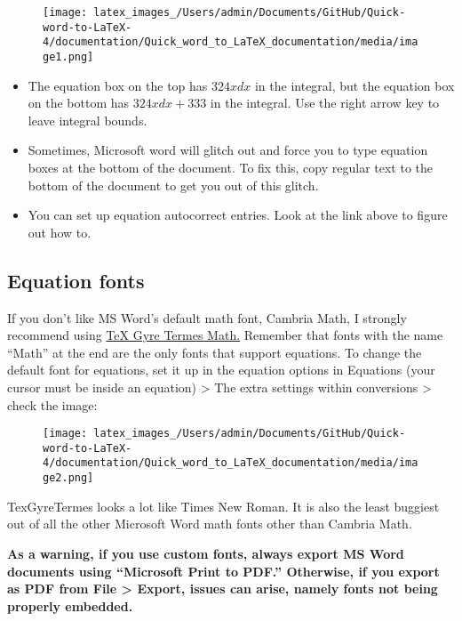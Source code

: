 \documentclass[12pt]{article}
\theoremstyle{plain}
\theoremstyle{remark}
\theoremstyle{definition}
\begin{document}
\begin{figure}[H]
\centering
\texttt{[image: latex\_images\_/Users/admin/Documents/GitHub/Quick-word-to-LaTeX-4/documentation/Quick\_word\_to\_LaTeX\_documentation/media/image1.png]}
\end{figure}


\begin{itemize}
\item
  The equation box on the top has \(324xdx\) in the integral, but the
  equation box on the bottom has \(324xdx + 333\) in the integral. Use
  the right arrow key to leave integral bounds.
\item
  Sometimes, Microsoft word will glitch out and force you to type
  equation boxes at the bottom of the document. To fix this, copy
  regular text to the bottom of the document to get you out of this
  glitch.
\item
  You can set up equation autocorrect entries. Look at the link above to
  figure out how to.
\end{itemize}


\subsection{Equation fonts}

If you don't like MS Word's default math font, Cambria Math, I strongly
recommend using
\href{https://ctan.org/pkg/tex-gyre-math-termes?lang=en}{TeX Gyre Termes
Math.} Remember that fonts with the name ``Math'' at the end are the
only fonts that support equations. To change the default font for
equations, set it up in the equation options in Equations (your cursor
must be inside an equation) \textgreater{} The extra settings within
conversions \textgreater{} check the image:


\begin{figure}[H]
\centering
\texttt{[image: latex\_images\_/Users/admin/Documents/GitHub/Quick-word-to-LaTeX-4/documentation/Quick\_word\_to\_LaTeX\_documentation/media/image2.png]}
\end{figure}


TexGyreTermes looks a lot like Times New Roman. It is also the least
buggiest out of all the other Microsoft Word math fonts other than
Cambria Math.

\textbf{As a warning, if you use custom fonts, always export MS Word
documents using ``Microsoft Print to PDF.'' Otherwise, if you export as
PDF from File \textgreater{} Export, issues can arise, namely fonts not
being properly embedded.}
\end{document}
